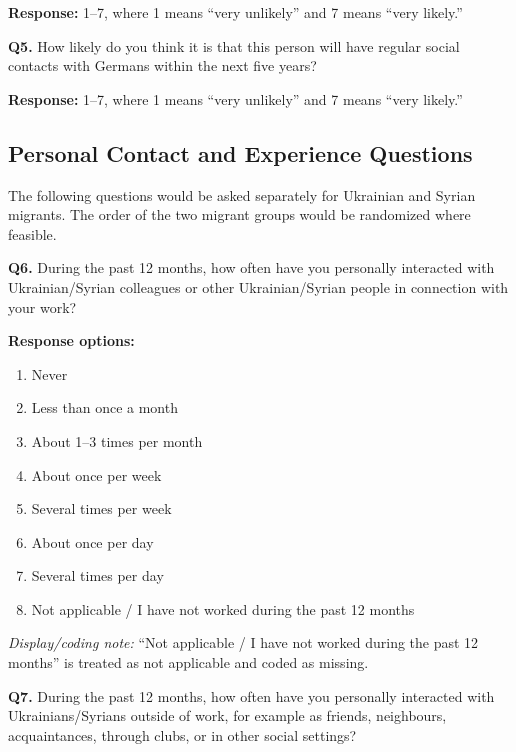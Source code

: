 \noindent
\textbf{Response:} 1--7, where 1 means ``very unlikely'' and 7 means
``very likely.''

\medskip

\noindent\textbf{Q5.}
How likely do you think it is that this person will have regular social contacts
with Germans within the next five years? 

\smallskip

\noindent
\textbf{Response:} 1--7, where 1 means ``very unlikely'' and 7 means
``very likely.''

\subsection{Personal Contact and Experience Questions}

The following questions would be asked separately for Ukrainian and Syrian
migrants. The order of the two migrant groups would be randomized where feasible.

\medskip

\noindent\textbf{Q6.}
During the past 12 months, how often have you personally interacted with
Ukrainian/Syrian colleagues or other Ukrainian/Syrian people in connection
with your work?

\smallskip

\noindent\textbf{Response options:}

\begin{enumerate}
    \item Never
    \item Less than once a month
    \item About 1--3 times per month
    \item About once per week
    \item Several times per week
    \item About once per day
    \item Several times per day
    \item Not applicable / I have not worked during the past 12 months
\end{enumerate}

\noindent
\textit{Display/coding note:} ``Not applicable / I have not worked during the
past 12 months'' is treated as not applicable and coded as missing.

\medskip

\noindent\textbf{Q7.}
During the past 12 months, how often have you personally interacted with
Ukrainians/Syrians outside of work, for example as friends, neighbours,
acquaintances, through clubs, or in other social settings?

